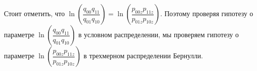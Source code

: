 Стоит отметить, что
$
\ln\left(\dfrac{q_{00}q_{11}}{q_{01}q_{10}}\right) =
\ln\left(\dfrac{p_{00z}p_{11z}}{p_{01z}p_{10z}}\right)
$. Поэтому проверяя гипотезу о параметре
$\ln\left(\dfrac{q_{00}q_{11}}{q_{01}q_{10}}\right)$ в условном распределении,
мы проверяем гипотезу о параметре $\ln\left(\dfrac{p_{00z}p_{11z}}{p_{01z}p_{10z}}\right)$
в трехмерном распределении Бернулли.

